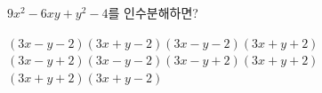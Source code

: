 $9x^2-6xy+y^2-4$를 인수분해하면?
\begin{choicesv}{$(3x-y-2)(3x+y-2)$}{$(3x-y-2)(3x+y+2)$}{$(3x-y+2)(3x-y-2)$}{$(3x-y+2)(3x+y+2)$}{$(3x+y+2)(3x+y-2)$}\end{choicesv}
